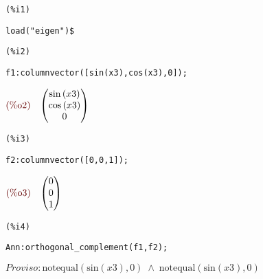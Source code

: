 \noindent
\begin{minipage}[t]{8ex}
\color{red}\bf
\begin{verbatim}
(%i1) 
\end{verbatim}
\end{minipage}
\begin{minipage}[t]{\textwidth}
\color{blue}
\begin{verbatim}
load("eigen")$
\end{verbatim}
\end{minipage}


\noindent
\begin{minipage}[t]{8ex}
\color{red}\bf
\begin{verbatim}
(%i2) 
\end{verbatim}
\end{minipage}
\begin{minipage}[t]{\textwidth}
\color{blue}
\begin{verbatim}
f1:columnvector([sin(x3),cos(x3),0]);
\end{verbatim}
\end{minipage}
\begin{math}\displaystyle
\parbox{8ex}{\color{labelcolor}(\%o2) }
\begin{pmatrix}\mathrm{sin}\left( x3\right) \cr \mathrm{cos}\left( x3\right) \cr 0\end{pmatrix}
\end{math}


\noindent
\begin{minipage}[t]{8ex}
\color{red}\bf
\begin{verbatim}
(%i3) 
\end{verbatim}
\end{minipage}
\begin{minipage}[t]{\textwidth}
\color{blue}
\begin{verbatim}
f2:columnvector([0,0,1]);
\end{verbatim}
\end{minipage}
\begin{math}\displaystyle
\parbox{8ex}{\color{labelcolor}(\%o3) }
\begin{pmatrix}0\cr 0\cr 1\end{pmatrix}
\end{math}


\noindent
\begin{minipage}[t]{8ex}
\color{red}\bf
\begin{verbatim}
(%i4) 
\end{verbatim}
\end{minipage}
\begin{minipage}[t]{\textwidth}
\color{blue}
\begin{verbatim}
Ann:orthogonal_complement(f1,f2);
\end{verbatim}
\end{minipage}
\begin{math}\displaystyle
Proviso: \mathrm{notequal}\left( \mathrm{sin}\left( x3\right) ,0\right)  \;\wedge\; \mathrm{notequal}\left( \mathrm{sin}\left( x3\right) ,0\right) 
\end{math}

